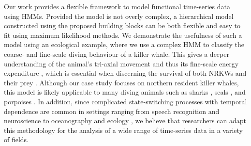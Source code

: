 
Our work provides a flexible framework to model functional time-series data using HMMs. Provided the model is not overly complex, a hierarchical model constructed using the proposed building blocks can be both flexible and easy to fit using maximum likelihood methods. We demonstrate the usefulness of such a model using an ecological example, where we use a complex HMM to classify the coarse- and fine-scale diving behaviour of a killer whale. This gives a deeper understanding of the animal's tri-axial movement and thus its fine-scale energy expenditure \citep{Gleiss:2011,Qasem:2012}, which is essential when discerning the survival of both NRKWs and their prey \citep{Noren:2011}. Although our case study focuses on northern resident killer whales, this model is likely applicable to many diving animals such as sharks \citep{Adam:2019}, seals \citep{Dot:2016}, and porpoises \citep{Barajas:2017}. In addition, since complicated state-switching processes with temporal dependence are common in settings ranging from speech recognition \citep{Juang:1991} and neuroscience \citep{Langrock:2013} to oceanography \citep{Bulla:2012} and ecology \citep{Adam:2019}, we believe that researchers can adapt this methodology for the analysis of a wide range of time-series data in a variety of fields.

\fi